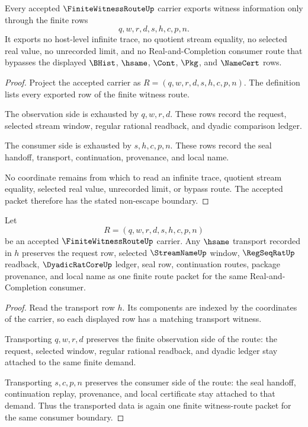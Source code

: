 \begin{theorem}
\label{thm:finite-witness-route-non-escape}
Every accepted $\FiniteWitnessRouteUp$ carrier exports witness information only through the finite rows
$$
q,w,r,d,s,h,c,p,n.
$$
It exports no host-level infinite trace, no quotient stream equality, no selected real value, no unrecorded limit, and no Real-and-Completion consumer route that bypasses the displayed $\BHist$, $\hsame$, $\Cont$, $\Pkg$, and $\NameCert$ rows.
\end{theorem}
\begin{proof}
Project the accepted carrier as $R=(q,w,r,d,s,h,c,p,n)$. The definition lists every exported row of the finite witness route.

The observation side is exhausted by $q,w,r,d$. These rows record the request, selected stream window, regular rational readback, and dyadic comparison ledger.

The consumer side is exhausted by $s,h,c,p,n$. These rows record the seal handoff, transport, continuation, provenance, and local name.

No coordinate remains from which to read an infinite trace, quotient stream equality, selected real value, unrecorded limit, or bypass route. The accepted packet therefore has the stated non-escape boundary.
\end{proof}

\begin{theorem}
\label{thm:finite-witness-route-transport-stability}
Let
$$
R=(q,w,r,d,s,h,c,p,n)
$$
be an accepted $\FiniteWitnessRouteUp$ carrier. Any $\hsame$ transport recorded in $h$ preserves the request row, selected $\StreamNameUp$ window, $\RegSeqRatUp$ readback, $\DyadicRatCoreUp$ ledger, seal row, continuation routes, package provenance, and local name as one finite route packet for the same Real-and-Completion consumer.
\end{theorem}
\begin{proof}
Read the transport row $h$. Its components are indexed by the coordinates of the carrier, so each displayed row has a matching transport witness.

Transporting $q,w,r,d$ preserves the finite observation side of the route: the request, selected window, regular rational readback, and dyadic ledger stay attached to the same finite demand.

Transporting $s,c,p,n$ preserves the consumer side of the route: the seal handoff, continuation replay, provenance, and local certificate stay attached to that demand. Thus the transported data is again one finite witness-route packet for the same consumer boundary.
\end{proof}

